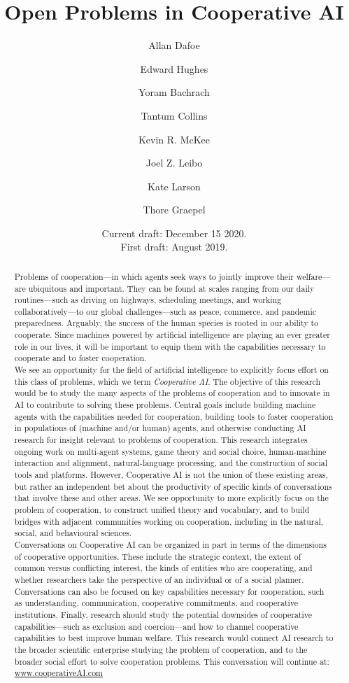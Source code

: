 \documentclass[11pt, a4paper, logo, onecolumn, nonumbering]{deepmind}
\title{Open Problems in Cooperative AI}
\author[1]{\small Allan Dafoe}
\author[2]{\small Edward Hughes}
\author[2]{\small Yoram Bachrach}
\author[2]{\small Tantum Collins}
\author[2]{\small Kevin R. McKee}
\author[2]{\small Joel Z. Leibo}
\author[2, 3]{\small Kate Larson}
\author[2]{\small Thore Graepel}
\affil[1]{\footnotesize Centre for the Governance of AI, Future of Humanity Institute, University of Oxford}
\affil[2]{\footnotesize DeepMind}
\affil[3]{\footnotesize University of Waterloo}
\date{Current draft: December 15 2020. \\First draft: August 2019.}
\begin{document}
\begin{abstract}
Problems of cooperation---in which agents seek ways to jointly improve their welfare---are ubiquitous and important. They can be found at scales ranging from our daily routines---such as driving on highways, scheduling meetings, and working collaboratively---to our global challenges---such as peace, commerce, and pandemic preparedness. Arguably, the success of the human species is rooted in our ability to cooperate. 
Since machines powered by artificial intelligence are playing an ever greater role in our lives, it will be important to equip them with the capabilities necessary to cooperate and to foster cooperation.\\ 
   
We see an opportunity for the field of artificial intelligence to explicitly focus effort on this class of problems, which we term \textit{Cooperative AI}. The objective of this research would be to study the many aspects of the problems of cooperation and to innovate in AI to contribute to solving these problems. Central goals include building machine agents with the capabilities needed for cooperation, building tools to foster cooperation in populations of (machine and/or human) agents, and otherwise conducting AI research for insight relevant to problems of cooperation.
This research integrates ongoing work on multi-agent systems, game theory and social choice, human-machine interaction and alignment, natural-language processing, and the construction of social tools and platforms. However, Cooperative AI is not the union of these existing areas, but rather an independent bet about the productivity of specific kinds of conversations that involve these and other areas. We see opportunity to more explicitly focus on the problem of cooperation, to construct unified theory and vocabulary, and to build bridges with adjacent communities working on cooperation, including in the natural, social, and behavioural sciences. \\ 

Conversations on Cooperative AI can be organized in part in terms of the dimensions of cooperative opportunities. These include the strategic context, the extent of common versus conflicting interest, the kinds of entities who are cooperating, and whether researchers take the perspective of an individual or of a social planner.
Conversations can also be focused on key capabilities necessary for cooperation, such as understanding, communication, cooperative commitments, and cooperative institutions.  Finally, research should study the potential downsides of cooperative capabilities---such as exclusion and coercion---and how to channel cooperative capabilities to best improve human welfare. This research would connect AI research to the broader scientific enterprise 
studying the problem of cooperation, and to the broader social effort to solve cooperation problems. This conversation will continue at: \href{https://www.cooperativeAI.com}{www.cooperativeAI.com}



\end{abstract}
\end{document}
